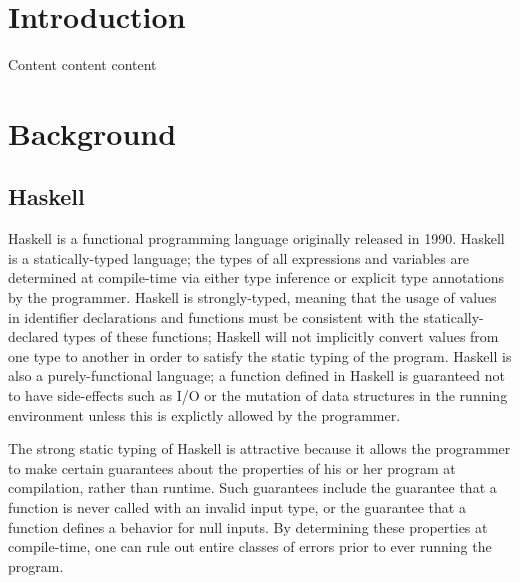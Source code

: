 \documentclass{sig-alternate}
\begin{document}

\section{Introduction}
\label{sec:intro}


Content content content

\section{Background}
\label{sec:background}

\subsection{Haskell}
\label{sec:background-haskell}

Haskell is a functional programming language originally released in 1990. Haskell is a statically-typed language; the types of all expressions and variables are determined at compile-time via either type inference or explicit type annotations by the programmer. Haskell is strongly-typed, meaning that the usage of values in identifier declarations and functions must be consistent with the statically-declared types of these functions; Haskell will not implicitly convert values from one type to another in order to satisfy the static typing of the program. Haskell is also a purely-functional language; a function defined in Haskell is guaranteed not to have side-effects such as I/O or the mutation of data structures in the running environment unless this is explictly allowed by the programmer. 

The strong static typing of Haskell is attractive because it allows the programmer to make certain guarantees about the properties of his or her program at compilation, rather than runtime. Such guarantees include the guarantee that a function is never called with an invalid input type, or the guarantee that a function defines a behavior for null inputs. By determining these properties at compile-time, one can rule out entire classes of errors prior to ever running the program.
\end{document}
